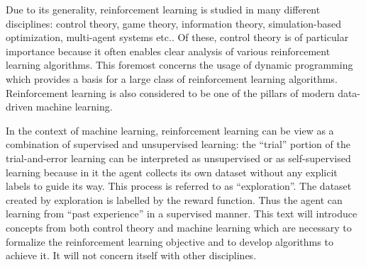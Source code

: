  

Due to its generality, reinforcement learning is studied in many different disciplines: 
control theory, game theory,
information theory, simulation-based optimization, multi-agent systems etc..
Of these, control theory is of particular importance because it
often enables clear analysis of various reinforcement learning algorithms.
This foremost concerns the usage of dynamic programming which
provides a basis for a large class of reinforcement learning algorithms.
Reinforcement learning is also considered to be one of the pillars of modern data-driven machine learning.


In the context of machine learning, reinforcement learning can be view as a combination of supervised and unsupervised learning:
the ``trial'' portion of the trial-and-error learning can be interpreted as unsupervised or as self-supervised learning
because in it the agent collects its own dataset without any explicit labels to guide its way.
This process is referred to as ``exploration''.
The dataset created by exploration is labelled by the reward function.
Thus the agent can learning from ``past experience'' in a supervised manner.
This text will introduce concepts from both control theory
and machine learning which are necessary to formalize the reinforcement learning objective
and to develop algorithms to achieve it.
It will not concern itself with other disciplines.


